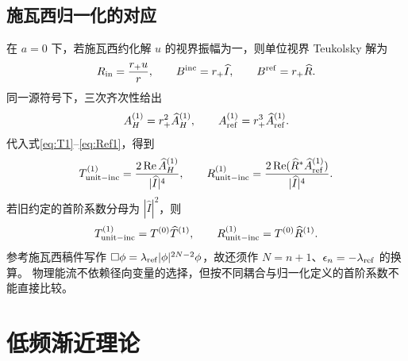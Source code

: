 \documentclass[UTF8,fontset=fandol,11pt,a4paper]{ctexart}
\newcommand{\Rea}{\operatorname{Re}}
\newcommand{\Bin}{B^{\mathrm{inc}}}
\newcommand{\Bref}{B^{\mathrm{ref}}}
\newcommand{\AH}{A_H^{(1)}}
\newcommand{\Aref}{A_{\mathrm{ref}}^{(1)}}
\numberwithin{equation}{section}
\begin{document}
\subsection{施瓦西归一化的对应}
在 $a=0$ 下，若施瓦西约化解 $u$ 的视界振幅为一，则单位视界 Teukolsky 解为
\begin{equation}
R_{\rm in}=\frac{r_+u}{r},\qquad \Bin=r_+\widehat I,\qquad\Bref=r_+\widehat R.
\end{equation}
同一源符号下，三次齐次性给出
\begin{equation}
\AH=r_+^2\widehat A_H^{(1)},\qquad\Aref=r_+^3\widehat A_{\rm ref}^{(1)}.
\end{equation}
代入式\eqref{eq:T1}--\eqref{eq:Ref1}，得到
\begin{equation}
T^{(1)}_{\rm unit-inc}=\frac{2\Rea\widehat A_H^{(1)}}{|\widehat I|^4},\qquad
R^{(1)}_{\rm unit-inc}=\frac{2\Rea(\widehat R^*\widehat A_{\rm ref}^{(1)})}{|\widehat I|^4}.
\end{equation}
若旧约定的首阶系数分母为 $|\widehat I|^2$，则
\begin{equation}
T^{(1)}_{\rm unit-inc}=T^{(0)}\widehat T^{(1)},\qquad
R^{(1)}_{\rm unit-inc}=T^{(0)}\widehat R^{(1)}.
\end{equation}
参考施瓦西稿件\cite{HeTianZhangManuscript2026}写作
$\Box\phi=\lambda_{\rm ref}|\phi|^{2N-2}\phi$，故还须作 $N=n+1$、$\epsilon_n=-\lambda_{\rm ref}$ 的换算。
物理能流不依赖径向变量的选择，但按不同耦合与归一化定义的首阶系数不能直接比较。

\section{低频渐近理论}
\label{sec:IR}
\end{document}
